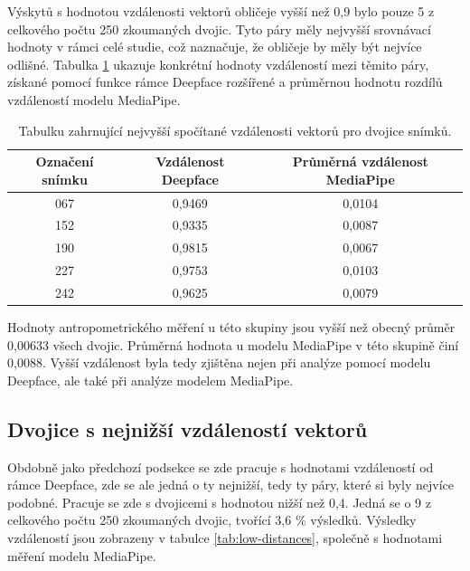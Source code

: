 Výskytů s hodnotou vzdálenosti vektorů obličeje vyšší než 0,9 bylo pouze 5 z celkového počtu 250 zkoumaných dvojic. Tyto páry měly nejvyšší srovnávací hodnoty v rámci celé studie, což naznačuje, že obličeje by měly být nejvíce odlišné. Tabulka \ref{tab:high-distances} ukazuje konkrétní hodnoty vzdáleností mezi těmito páry, získané pomocí funkce rámce Deepface rozšířené a průměrnou hodnotu rozdílů vzdáleností modelu MediaPipe.

\begin{table}[H]
        \centering
        \renewcommand{\arraystretch}{1.15}
        \begin{tabular}{|c|c|c|}
                \hline
                Označení snímku & Vzdálenost Deepface & Průměrná vzdálenost MediaPipe \\
                \hline
                067 & 0,9469 & 0,0104 \\
                152 & 0,9335 & 0,0087 \\
                190 & 0,9815 & 0,0067 \\
                227 & 0,9753 & 0,0103 \\
                242 & 0,9625 & 0,0079 \\
                \hline
        \end{tabular}
        \caption{Tabulku zahrnující nejvyšší spočítané vzdálenosti vektorů pro dvojice snímků.}
        \label{tab:high-distances}
\end{table}

Hodnoty antropometrického měření u této skupiny jsou vyšší než obecný průměr 0,00633 všech dvojic. Průměrná hodnota u modelu MediaPipe v této skupině činí 0,0088. Vyšší vzdálenost byla tedy zjištěna nejen při analýze pomocí modelu Deepface, ale také při analýze modelem MediaPipe.

\subsection*{Dvojice s nejnižší vzdáleností vektorů}

Obdobně jako předchozí podsekce se zde pracuje s hodnotami vzdáleností od rámce Deepface, zde se ale jedná o ty nejnižší, tedy ty páry, které si byly nejvíce podobné. Pracuje se zde s dvojicemi s hodnotou nižší než 0,4. Jedná se o 9 z celkového počtu 250 zkoumaných dvojic, tvořící 3,6 \% výsledků. Výsledky vzdáleností jsou zobrazeny v tabulce \ref{tab:low-distances}, společně s hodnotami měření modelu MediaPipe.

